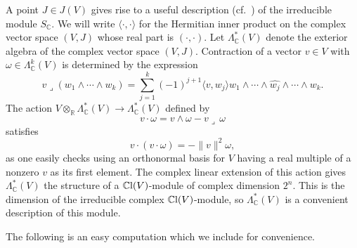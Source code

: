 \documentclass[pdftex]{sigma}%
\newcommand{\R}{\mathbb{R}}
\newcommand{\C}{\mathbb{C}}
\newcommand{\CCl}{\mathbb{C}{\rm l}}
\numberwithin{equation}{section}
\begin{document}
A point $J \in J(V)$ gives rise to a useful description (cf.~\cite[Chapter I, equation~(5.27)]{LM})
of the irreducible module $S_\C$.
We will write $\langle \cdot, \cdot \rangle$ for the Hermitian inner product on the complex vector space $(V,J)$ whose real part is $ (\cdot, \cdot )$.
Let $\Lambda_\C^*(V)$ denote the exterior algebra of the complex vector space $(V,J)$.
Contraction of a vector $v \in V$ with $\omega \in \Lambda_\C^k(V)$ is determined by the expression
\[
v \lrcorner (w_1 \wedge \cdots \wedge w_k) = \sum_{j=1}^k (-1)^{j+1}\langle v, w_j \rangle w_1 \wedge \cdots \wedge \widehat{w_j} \wedge \cdots \wedge w_k.
\]
The action $V \otimes_\R \Lambda_\C^*(V) \to \Lambda_\C^*(V)$ defined by
\begin{equation*}
v \cdot \omega = v \wedge \omega - v \lrcorner \, \omega
\end{equation*}
satisfies
\begin{equation*}
v\cdot(v \cdot \omega) = - \|v\|^2 \omega,
\end{equation*}
as one easily checks using an orthonormal basis for $V$ having a
real multiple of a nonzero $v$ as its first element. The complex linear extension of this action gives $\Lambda_\C^*(V)$ the structure of a $\CCl(V)$-module of complex dimension $2^n$. This is the dimension of the irreducible complex $\CCl(V)$-module, so $\Lambda_\C^*(V)$ is a convenient description of this module.

The following is an easy computation which we include for convenience.
\end{document}
